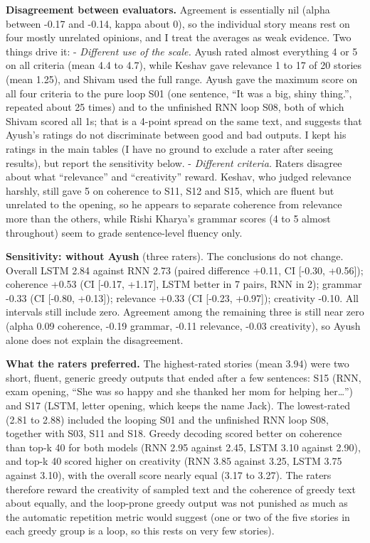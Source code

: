 \documentclass[10pt,a4paper]{article}
\begin{document}
\textbf{Disagreement between evaluators.} Agreement is essentially nil (alpha between -0.17 and -0.14, kappa about 0), so the individual story
means rest on four mostly unrelated opinions, and I treat the averages as weak evidence. Two things drive it:
- \emph{Different use of the scale.} Ayush rated almost everything 4 or 5 on all criteria (mean 4.4 to 4.7), while Keshav gave relevance 1 to 17 of 20
stories (mean 1.25), and Shivam used the full range. Ayush gave the maximum score on all four criteria to the pure loop S01 (one sentence, ``It was a big, shiny
thing.'', repeated about 25 times) and to the unfinished RNN loop S08, both of which Shivam scored all 1s; that is a 4-point spread on the same text, and suggests that Ayush's
ratings do not discriminate between good and bad outputs. I kept his ratings in the main tables (I have no ground to exclude a rater after seeing results), but report
the sensitivity below.
- \emph{Different criteria.} Raters disagree about what ``relevance'' and ``creativity'' reward. Keshav, who judged relevance harshly, still gave 5 on coherence to S11, S12 and S15, which are
fluent but unrelated to the opening, so he appears to separate coherence from relevance more than the others, while Rishi Kharya's grammar scores (4 to 5 almost throughout) seem to grade
sentence-level fluency only.

\textbf{Sensitivity: without Ayush} (three raters). The conclusions do not change. Overall LSTM 2.84 against RNN 2.73 (paired difference +0.11, CI {[}-0.30, +0.56{]}); coherence
+0.53 (CI {[}-0.17, +1.17{]}, LSTM better in 7 pairs, RNN in 2); grammar -0.33 (CI {[}-0.80, +0.13{]}); relevance +0.33 (CI {[}-0.23, +0.97{]}); creativity -0.10. All intervals still include zero.
Agreement among the remaining three is still near zero (alpha 0.09 coherence, -0.19 grammar, -0.11 relevance, -0.03 creativity), so Ayush alone does not explain the disagreement.

\textbf{What the raters preferred.} The highest-rated stories (mean 3.94) were two short, fluent, generic greedy outputs that ended after a few sentences: S15 (RNN, exam opening, ``She was so happy and she thanked her mom for
helping her\ldots{}'') and S17 (LSTM, letter opening, which keeps the name Jack). The lowest-rated (2.81 to 2.88) included the looping S01 and the unfinished RNN loop S08, together with S03, S11 and S18. Greedy
decoding scored better on coherence than top-k 40 for both models (RNN 2.95 against 2.45, LSTM 3.10 against 2.90), and top-k 40 scored higher on creativity
(RNN 3.85 against 3.25, LSTM 3.75 against 3.10), with the overall score nearly equal (3.17 to 3.27). The raters therefore reward the creativity of sampled text and the coherence of greedy
text about equally, and the loop-prone greedy output was not punished as much as the automatic repetition metric would suggest (one or two of the five stories in each greedy group is a loop, so this rests on very few stories).
\end{document}
